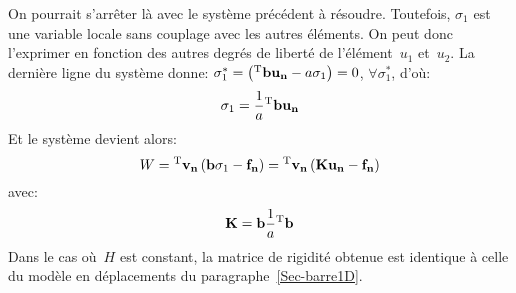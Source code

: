 \medskipvm
On pourrait s'arrêter là avec le système précédent à résoudre. Toutefois, $\sigma_1$ est une variable locale sans couplage avec les autres éléments. On peut donc l'exprimer en fonction des autres degrés de liberté de l'élément~$u_1$ et~$u_2$. La dernière ligne du système donne:
$\sigma_1^*=\left(\LL{b}\VV{u_n}-a\sigma_1\right)=0$, $\forall \sigma_1^*$,
d'où:
\begin{equation} \sigma_1 = \frac1a \LL{b}\VV{u_n} \end{equation}
\medskipvm
Et le système devient alors:
\begin{equation} W=\LL{v_n}\left( \VV{b}\sigma_1 -\VV{f_n}\right) =
\LL{v_n} \left( \MM{K}\VV{u_n}-\VV{f_n}\right) \end{equation}
avec:
\begin{equation} \MM{K}=\VV{b}\frac1a\LL{b} \end{equation}
Dans le cas où~$H$ est constant, la matrice de rigidité obtenue est identique à celle du modèle en déplacements du paragraphe~\ref{Sec-barre1D}.
